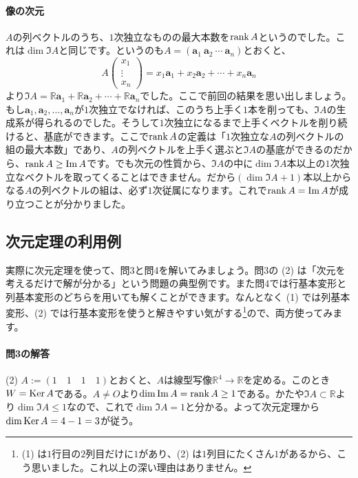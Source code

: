 \paragraph{像の次元}

$A$の列ベクトルのうち、$1$次独立なものの最大本数を$\operatorname{rank} A$というのでした。これは$\dim \Im A$と同じです。というのも$A = (\bm{a}_1\ \bm{a}_2\ \cdots\ \bm{a}_n)$とおくと、
\[
A
\begin{pmatrix}
x_1 \\
\vdots \\
x_n
\end{pmatrix}
= x_1 \bm{a}_1 + x_2 \bm{a}_2 + \cdots + x_n \bm{a}_n
\]
より$\Im A = \mathbb{R}\bm{a}_1 + \mathbb{R}\bm{a}_2 + \cdots + \mathbb{R}\bm{a}_n$でした。ここで前回の結果を思い出しましょう。もし$\bm{a}_1, \bm{a}_2, \ldots, \bm{a}_n$が$1$次独立でなければ、このうち上手く$1$本を削っても、$\Im A$の生成系が得られるのでした。そうして$1$次独立になるまで上手くベクトルを削り続けると、基底ができます。ここで$\operatorname{rank} A$の定義は「$1$次独立な$A$の列ベクトルの組の最大本数」であり、$A$の列ベクトルを上手く選ぶと$\Im A$の基底ができるのだから、$\operatorname{rank} A \geq \mathrm{Im}\, A$です。でも次元の性質から、$\Im A$の中に$\dim \Im A$本以上の$1$次独立なベクトルを取ってくることはできません。だから$(\dim \Im A + 1)$本以上からなる$A$の列ベクトルの組は、必ず$1$次従属になります。これで$\operatorname{rank} A = \mathrm{Im}\, A$が成り立つことが分かりました。

\subsection{次元定理の利用例}

実際に次元定理を使って、問3と問4を解いてみましょう。問3の (2) は「次元を考えるだけで解が分かる」という問題の典型例です。また問4では行基本変形と列基本変形のどちらを用いても解くことができます。なんとなく (1) では列基本変形、(2) では行基本変形を使うと解きやすい気がする\footnote{(1) は$1$行目の$2$列目だけに$1$があり、(2) は$1$列目にたくさん$1$があるから、こう思いました。これ以上の深い理由はありません。}ので、両方使ってみます。

\paragraph{問3の解答}
\noindent (2) $A := (1 \quad 1 \quad 1 \quad 1)$とおくと、$A$は線型写像$\mathbb{R}^4\rightarrow\mathbb{R}$を定める。このとき$W = \operatorname{Ker} A$である。$A \neq O$より$\dim \mathrm{Im}\, A = \operatorname{rank} A \geq 1$である。かたや$\Im A \subset\mathbb{R}$より$\dim \Im A \leq 1$なので、これで$\dim \Im A = 1$と分かる。よって次元定理から$\dim \operatorname{Ker} A = 4 - 1 = 3$が従う。

